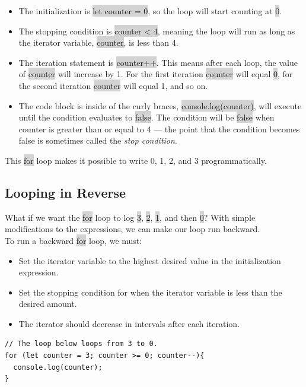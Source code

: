 \documentclass[11pt]{article}
\begin{document}
\begin{itemize}[leftmargin = *]
\item The initialization is \colorbox{lightgray}{let counter = 0}, so the loop will start counting at \colorbox{lightgray}{0}.
\item The stopping condition is \colorbox{lightgray}{counter < 4}, meaning the loop will run as long as the iterator variable, \colorbox{lightgray}{counter}, is less than 4.
\item The iteration statement is \colorbox{lightgray}{counter++}. This means after each loop, the value of \colorbox{lightgray}{counter} will increase by 1. For the first iteration \colorbox{lightgray}{counter} will equal \colorbox{lightgray}{0}, for the second iteration \colorbox{lightgray}{counter} will equal 1, and so on.
\item The code block is inside of the curly braces, \colorbox{lightgray}{console.log(counter)}, will execute until the condition evaluates to \colorbox{lightgray}{false}. The condition will be \colorbox{lightgray}{false} when counter is greater than or equal to 4 — the point that the condition becomes false is sometimes called the \textit{stop condition}.
\end{itemize}
This \colorbox{lightgray}{for} loop makes it possible to write 0, 1, 2, and 3 programmatically.

\subsection{Looping in Reverse}

What if we want the \colorbox{lightgray}{for} loop to log \colorbox{lightgray}{3}, \colorbox{lightgray}{2}, \colorbox{lightgray}{1}, and then \colorbox{lightgray}{0}? With simple modifications to the expressions, we can make our loop run backward. \\
\newline
To run a backward \colorbox{lightgray}{for} loop, we must:
\begin{itemize}[leftmargin = *]
\item Set the iterator variable to the highest desired value in the initialization expression.
\item Set the stopping condition for when the iterator variable is less than the desired amount.
\item The iterator should decrease in intervals after each iteration.
\end{itemize} 
\begin{lstlisting}
// The loop below loops from 3 to 0.
for (let counter = 3; counter >= 0; counter--){
  console.log(counter);
}
\end{lstlisting}
\end{document}
